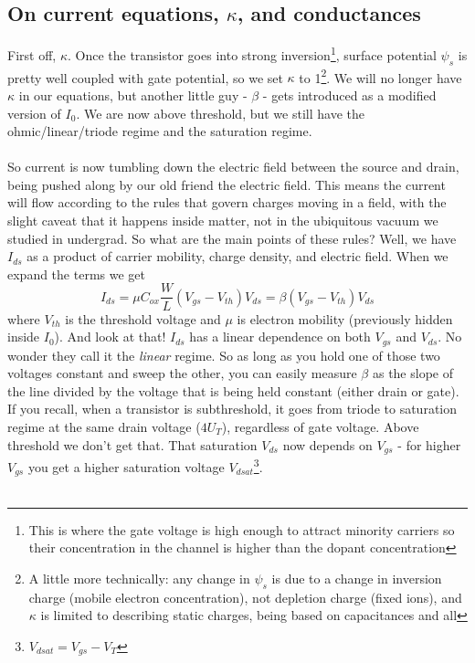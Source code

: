 \documentclass[main]{subfiles}
\begin{document}
\subsection{On current equations, $\kappa$, and conductances}
First off, $\kappa$. Once the transistor goes into strong inversion\footnote{This is where the gate voltage is high enough to attract minority carriers so their concentration in the channel is higher than the dopant concentration}, surface potential $\psi_s$ is pretty well coupled with gate potential, so we set $\kappa$ to 1\footnote{A little more technically: any change in $\psi_s$ is due to a change in inversion charge (mobile electron concentration), not depletion charge (fixed ions), and $\kappa$ is limited to describing static charges, being based on capacitances and all}. We will no longer have $\kappa$ in our equations, but another little guy - $\beta$ - gets introduced as a modified version of $I_0$. We are now above threshold, but we still have the ohmic/linear/triode regime and the saturation regime.\\ \\
So current is now tumbling down the electric field between the source and drain, being pushed along by our old friend the electric field. This means the current will flow according to the rules that govern charges moving in a field, with the slight caveat that it happens inside matter, not in the ubiquitous vacuum we studied in undergrad. So what are the main points of these rules? Well, we have $I_{ds}$ as a product of carrier mobility, charge density, and electric field. When we expand the terms we get
\begin{equation}
I_{ds} = \mu C_{ox}\frac{W}{L}(V_{gs} - V_{th})V_{ds} = \beta(V_{gs} - V_{th})V_{ds}
\label{abvTriodeEqn}
\end{equation}
where $V_{th}$ is the threshold voltage and $\mu$ is electron mobility (previously hidden inside $I_0$). And look at that! $I_{ds}$ has a linear dependence on both $V_{gs}$ and $V_{ds}$. No wonder they call it the \emph{linear} regime. So as long as you hold one of those two voltages constant and sweep the other, you can easily measure $\beta$ as the slope of the line divided by the voltage that is being held constant (either drain or gate). If you recall, when a transistor is subthreshold, it goes from triode to saturation regime at the same drain voltage ($4U_T$), regardless of gate voltage. Above threshold we don't get that. That saturation $V_{ds}$ now depends on $V_{gs}$ - for higher $V_{gs}$ you get a higher saturation voltage $V_{dsat}$\footnote{$V_{dsat} = V_{gs} - V_T$}.\\ \\
\end{document}
